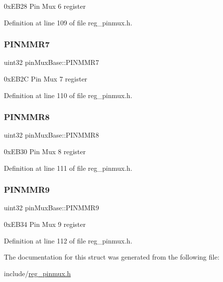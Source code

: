 0x\+E\+B28 Pin Mux 6 register 

Definition at line 109 of file reg\+\_\+pinmux.\+h.

\mbox{\label{structpinMuxBase_ac99df9383a0798ca780da5ef63137bed}} 
\subsubsection{\texorpdfstring{P\+I\+N\+M\+M\+R7}{PINMMR7}}
{\footnotesize\ttfamily uint32 pin\+Mux\+Base\+::\+P\+I\+N\+M\+M\+R7}

0x\+E\+B2C Pin Mux 7 register 

Definition at line 110 of file reg\+\_\+pinmux.\+h.

\mbox{\label{structpinMuxBase_a0e23d2591f33897f2c60247cdb7a3e77}} 
\subsubsection{\texorpdfstring{P\+I\+N\+M\+M\+R8}{PINMMR8}}
{\footnotesize\ttfamily uint32 pin\+Mux\+Base\+::\+P\+I\+N\+M\+M\+R8}

0x\+E\+B30 Pin Mux 8 register 

Definition at line 111 of file reg\+\_\+pinmux.\+h.

\mbox{\label{structpinMuxBase_a74b13c419d66022d6de6216a6444be1e}} 
\subsubsection{\texorpdfstring{P\+I\+N\+M\+M\+R9}{PINMMR9}}
{\footnotesize\ttfamily uint32 pin\+Mux\+Base\+::\+P\+I\+N\+M\+M\+R9}

0x\+E\+B34 Pin Mux 9 register 

Definition at line 112 of file reg\+\_\+pinmux.\+h.



The documentation for this struct was generated from the following file\+:\begin{DoxyCompactItemize}
\item 
include/\mbox{\hyperlink{reg__pinmux_8h}{reg\+\_\+pinmux.\+h}}\end{DoxyCompactItemize}
